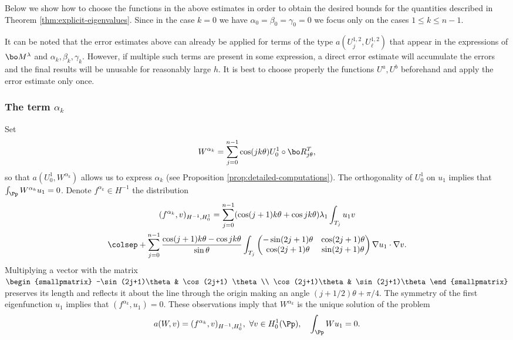 Below we show how to choose the functions in the above estimates in order to obtain the desired bounds for the quantities described in Theorem \ref{thm:explicit-eigenvalues}. Since in the case $k=0$ we have $\alpha_0=\beta_0=\gamma_0=0$ we focus only on the cases $1\leq k \leq n-1$.

\begin{rem}
\rm
It can be noted that the error estimates above can already be applied for terms of the type $a(U_j^{1,2},U_\ell^{1,2})$ that appear in the expressions of $\bo M^\lambda$ and $\alpha_k,\beta_k,\gamma_k$. However, if multiple such terms are present in some expression, a direct error estimate will accumulate the errors and the final results will be unusable for reasonably large $h$. It is best to choose properly the functions $U^a,U^b$ beforehand and apply the error estimate only once.
\label{rem:why-choose-different-functions}
\end{rem}

\subsubsection*{The term $\alpha_k$} Set
\[
W^{\alpha_k} = \sum_{j=0}^{n-1} \cos(jk\theta) U_0^1\circ \bo R_{j\theta}^T,
\]
so that $a(U_0^1,W^{\alpha_k})$ allows us to express $\alpha_k$ (see Proposition \ref{prop:detailed-computations}). The orthogonality of $U_0^1$ on $u_1$ implies that $\int_\Pp W^{\alpha_k}u_1=0$. Denote $f^{\alpha_k} \in H^{-1}$ the distribution
\vspace*{-5pt}
\begin{multline*}
(f^{\alpha_k},v)_{H^{-1},H_0^1}
= \sum_{j=0}^{n-1} (\cos (j+1)k\theta+\cos jk\theta) \lambda_1\int_{T_j} u_1 v\\ \colsep
+ \sum_{j=0}^{n-1} \frac{\cos(j+1)k\theta-\cos jk\theta}{\sin \theta} \int_{T_j}\begin{pmatrix}
-\sin (2j+1)\theta & \cos (2j+1) \theta \\
\cos(2j+1)\theta & \sin (2j+1)\theta
\end{pmatrix}\nabla u_1 \cdot \nabla v.
\end{multline*}
Multiplying a vector with the matrix $\begin{smallpmatrix}
-\sin (2j+1)\theta & \cos (2j+1) \theta \\
\cos(2j+1)\theta & \sin (2j+1)\theta
\end{smallpmatrix}$ preserves its length and reflects it about the line through the origin making an angle $(j+1/2)\theta+\pi/4$. The symmetry of the first eigenfunction $u_1$ implies that $(f^{\alpha_k},u_1) = 0$. These observations imply that $W^{\alpha_k}$ is the unique solution of the problem
\[
a(W,v) = (f^{\alpha_k},v)_{H^{-1},H_0^1},\ \forall v \in H_0^1(\Pp),\quad \int_\Pp Wu_1=0.
\]

